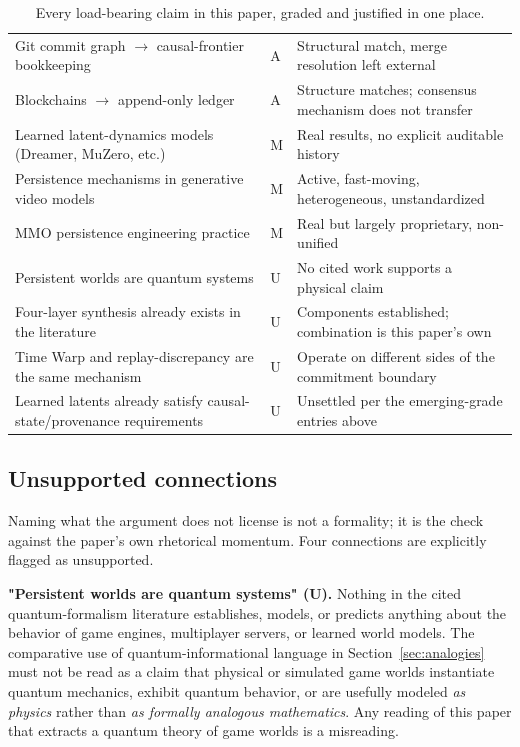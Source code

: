 \documentclass[11pt]{article}
\begin{document}
\begin{table}[h]
\begin{tabular}{p{5.2cm}p{1.3cm}p{6.8cm}}
Git commit graph $\to$ causal-frontier bookkeeping & A & Structural match, merge resolution left external \\
Blockchains $\to$ append-only ledger & A & Structure matches; consensus mechanism does not transfer \\
Learned latent-dynamics models (Dreamer, MuZero, etc.) & M & Real results, no explicit auditable history \\
Persistence mechanisms in generative video models & M & Active, fast-moving, heterogeneous, unstandardized \\
MMO persistence engineering practice & M & Real but largely proprietary, non-unified \\
Persistent worlds are quantum systems & U & No cited work supports a physical claim \\
Four-layer synthesis already exists in the literature & U & Components established; combination is this paper's own \\
Time Warp and replay-discrepancy are the same mechanism & U & Operate on different sides of the commitment boundary \\
Learned latents already satisfy causal-state/provenance requirements & U & Unsettled per the emerging-grade entries above \\
\bottomrule
\end{tabular}
\caption{Every load-bearing claim in this paper, graded and justified in one place.}
\label{tab:grading-summary}
\end{table}

\subsection{Unsupported connections}
\label{sec:unsupported}

Naming what the argument does not license is not a formality; it is the check against the paper's own rhetorical momentum. Four connections are explicitly flagged as unsupported.

\textbf{"Persistent worlds are quantum systems" (U).} Nothing in the cited quantum-formalism literature establishes, models, or predicts anything about the behavior of game engines, multiplayer servers, or learned world models. The comparative use of quantum-informational language in Section~\ref{sec:analogies} must not be read as a claim that physical or simulated game worlds instantiate quantum mechanics, exhibit quantum behavior, or are usefully modeled \emph{as physics} rather than \emph{as formally analogous mathematics}. Any reading of this paper that extracts a quantum theory of game worlds is a misreading.
\end{document}
